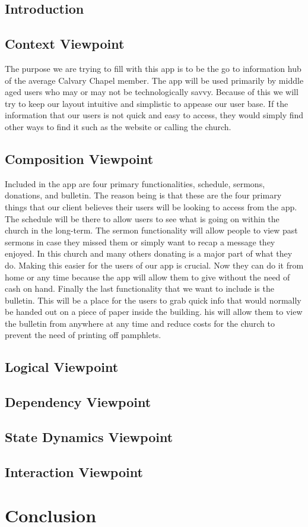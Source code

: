 \documentclass[letterpaper,10pt,draftclsnofoot,onecolumn,titlepage]{IEEEtran}
\begin{document}
		\subsection{Introduction}
		
		\subsection{Context Viewpoint}
		The purpose we are trying to fill with this app is to be the go to information hub of the average Calvary Chapel member. 
		The app will be used primarily by middle aged users who may or may not be technologically savvy. 
		Because of this we will try to keep our layout intuitive and simplistic to appease our user base. 
		If the information that our users is not quick and easy to access, they would simply find other ways to find it such as the website or calling the church.
		\subsection{Composition Viewpoint}
		Included in the app are four primary functionalities, schedule, sermons, donations, and bulletin. 
		The reason being is that these are the four primary things that our client believes their users will be looking to access from the app. 
		The schedule will be there to allow users to see what is going on within the church in the long-term. 
		The sermon functionality will allow people to view past sermons in case they missed them or simply want to recap a message they enjoyed. 
		In this church and many others donating is a major part of what they do. 
		Making this easier for the users of our app is crucial. 
		Now they can do it from home or any time because the app will allow them to give without the need of cash on hand. 
		Finally the last functionality that we want to include is the bulletin. 
		This will be a place for the users to grab quick info that would normally be handed out on a piece of paper inside the building. 
		his will allow them to view the bulletin from anywhere at any time and reduce costs for the church to prevent the need of printing off pamphlets. 
		\subsection{Logical Viewpoint}
		
		\subsection{Dependency Viewpoint}
		
		\subsection{State Dynamics Viewpoint}
		
		\subsection{Interaction Viewpoint}
		
	\section{Conclusion}
	
	
\end{document}
